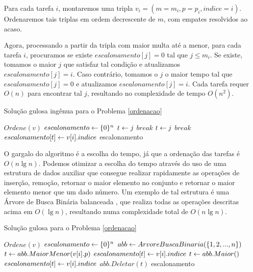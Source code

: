 Para cada tarefa $i$, montaremos uma tripla $v_i = (m = m_i, p = p_i, indice = i)$. Ordenaremos tais triplas em ordem decrescente de $m$, com empates resolvidos ao acaso. 

Agora, processando a partir da tripla com maior multa até a menor, para cada tarefa $i$, procuramos se existe $escalonamento[j] = 0$ tal que $j \leq m_i$. Se existe, tomamos o maior $j$ que satisfaz tal condição e atualizamos $escalonamento[j] = i$. Caso contrário, tomamos o $j$ o maior tempo tal que $escalonamento[j] = 0$ e atualizamos $escalonamento[j] = i$. Cada tarefa requer $O(n)$ para encontrar tal $j$, resultando no complexidade de tempo $O(n^2)$.

\begin{algorithm}[H]
\caption{Solução gulosa ingênua para o Problema \ref{ordenacao}}
\label{ordenacao:code_naive}
\begin{algorithmic}[1]
    \State $Ordene(v)$
    \State $escalonamento \leftarrow \{0\}^n$
                \State $t \leftarrow j$
                \State $break$
            \EndIf
        \EndFor
                \State $t \leftarrow j$
                \State $break$
            \EndIf
        \EndFor
        \State $escalonamento[t] \leftarrow v[i].indice$
    \EndFor
    \State \Return escalonamento
\EndFunction
\end{algorithmic}
\end{algorithm}

O gargalo do algoritmo é a escolha do tempo, já que a ordenação das tarefas é $O(n \lg n)$. Podemos otimizar a escolha do tempo através do uso de uma estrutura de dados auxiliar que consegue realizar rapidamente as operações de inserção, remoção, retornar o maior elemento no conjunto e retornar o maior elemento menor que um dado número. Um exemplo de tal estrutura é uma Árvore de Busca Binária balanceada \cite{mehta2004handbook}, que realiza todas as operações descritas acima em $O(\lg n)$, resultando numa complexidade total de $O(n \lg n)$.

\begin{algorithm}[H]
\caption{Solução gulosa para o Problema \ref{ordenacao}}
\label{ordenacao:code}
\begin{algorithmic}[1]
    \State $Ordene(v)$
    \State $escalonamento \leftarrow \{0\}^n$
    \State $abb \leftarrow ArvoreBuscaBinaria(\{1, 2, ..., n\})$
        \State $t \leftarrow abb.MaiorMenor(v[i].p)$
            \State $escalonamento[t] \leftarrow v[i].indice$
        \Else
            \State $t \leftarrow abb.Maior()$
            \State $escalonamento[t] \leftarrow v[i].indice$
        \EndIf
        \State $abb.Deletar(t)$
    \EndFor
    \State \Return escalonamento
\EndFunction
\end{algorithmic}
\end{algorithm}

